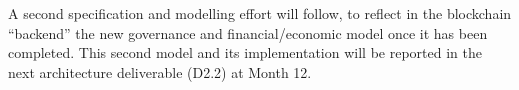 A second specification and modelling effort will follow, to reflect in the blockchain ``backend'' the new governance and financial/economic model once it has been completed. This second model and its implementation will be reported in the next architecture deliverable (D2.2) at Month 12.











